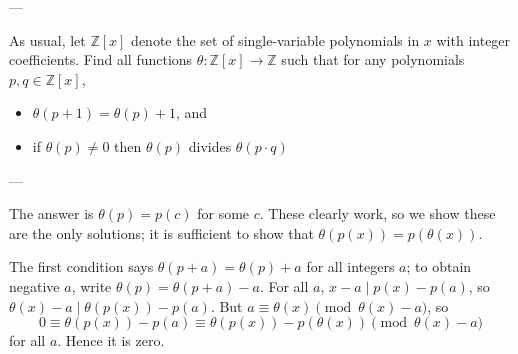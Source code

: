 
---

As usual, let $\mathbb Z[x]$ denote the set of single-variable polynomials in $x$ with integer coefficients. Find all functions $\theta:\mathbb Z[x]\to\mathbb Z$ such that for any polynomials $p,q\in\mathbb Z[x]$,
\begin{itemize}[itemsep=0em]
    \item $\theta(p+1)=\theta(p)+1$, and
    \item if $\theta(p)\ne0$ then $\theta(p)$ divides $\theta(p\cdot q)$
\end{itemize}

---

The answer is $\theta(p)=p(c)$ for some $c$. These clearly work, so we show these are the only solutions; it is sufficient to show that $\theta(p(x))=p(\theta(x))$.

The first condition says $\theta(p+a)=\theta(p)+a$ for all integers $a$; to obtain negative $a$, write $\theta(p)=\theta(p+a)-a$. For all $a$, $x-a\mid p(x)-p(a)$, so $\theta(x)-a\mid\theta(p(x))-p(a)$. But $a\equiv\theta(x)\pmod{\theta(x)-a}$, so \[0\equiv\theta(p(x))-p(a)\equiv\theta(p(x))-p(\theta(x))\pmod{\theta(x)-a}\]
for all $a$. Hence it is zero.
